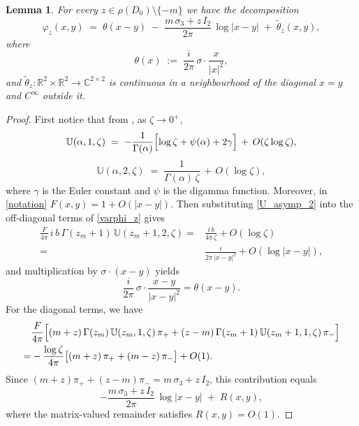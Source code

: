 \documentclass[11pt,a4paper,reqno,oneside]{amsproc}
\def \rr {{\mathbb R}}
\def \cc {{\mathbb C}}
\numberwithin{equation}{section}
\def\var{\varphi}
\def \cc {{\mathbb{C}}}
\newtheorem{lemma}[definition]{Lemma}
\begin{document}
\begin{lemma}\label{lemma:varphi_asymp}
For every $z\in\rho(D_0)\setminus\{-m\}$ we have the decomposition
\begin{equation*}%
\var_z(x,y) \;=\; \theta(x-y) \;-\; \frac{m\,\sigma_3 + z\,I_2}{2\pi}\,\log|x-y| \;+\; \widetilde\theta_z(x,y),
\end{equation*}
where
\begin{equation*}
\theta(x) \;:=\;\frac{i}{2\pi} \,\sigma\!\cdot\!\frac{x}{|x|^2},
\end{equation*}
and  $\widetilde\theta_z:\rr^2\times\rr^2\to\cc^{2\times 2}$ is continuous in a neighbourhood of the diagonal $x=y$ and $C^\infty$ outside it.
\end{lemma}

\begin{proof}
First notice that from  \cite[(13.2.19), (13.5.17)]{Olver}, as $\zeta\to 0^+$,
\begin{equation*}%
\mathbb{U}(\alpha,1,\zeta) \;=\; -\frac{1}{\Gamma(\alpha)}\Bigl[\log\zeta + \psi(\alpha) + 2\gamma\Bigr] \,+\, O(\zeta\log\zeta),
\end{equation*}
\begin{equation}\label{U_asymp_2}
\mathbb{U}(\alpha,2,\zeta) \;=\; \frac{1}{\Gamma(\alpha)\,\zeta} \,+\, O(\log\zeta),
\end{equation}
where $\gamma$ is the Euler constant and $\psi$ is the digamma function. Moreover, in \eqref{notation}  $F(x,y) = 1 + O(|x-y|)$. Then 
substituting \eqref{U_asymp_2} into the off-diagonal terms of \eqref{varphi_z} gives 
\begin{align*}
\frac{F}{4\pi}\,i\,b\,\Gamma(z_m+1)\,\mathbb{U}(z_m+1,2,\zeta) =& \frac{i\,b}{4\pi\,\zeta}+O(\log \zeta) \\
=& \frac{i}{2\pi\,|x-y|^2}+O(\log |x-y|),
\end{align*}
and multiplication by $\sigma\!\cdot\!(x-y)$ yields 
\[
\frac{i}{2\pi}\,\sigma\!\cdot\!\frac{x-y}{|x-y|^2}=\theta(x-y).
\]
For the diagonal terms, we have 
\begin{align*}
&\frac{F}{4\pi}\Bigl[(m+z)\,\Gamma(z_m)\,\mathbb{U}(z_m,1,\zeta)\,\pi_+ + (z-m)\,\Gamma(z_m+1)\,\mathbb{U}(z_m+1,1,\zeta)\,\pi_-\Bigr]
\\
=& -\frac{\log\zeta}{4\pi}\bigl[(m+z)\,\pi_+ + (m-z)\,\pi_-\bigr]+O(1).
\end{align*}
Since $(m+z)\pi_+ + (z-m)\pi_- = m\,\sigma_3 + z\,I_2$, this contribution equals
\[
-\frac{m\,\sigma_3 + z\,I_2}{2\pi}\,\log|x-y| \;+\; R(x,y),
\]
where the matrix-valued remainder satisfies $R(x,y)=O(1)$.
\end{proof}
\end{document}
